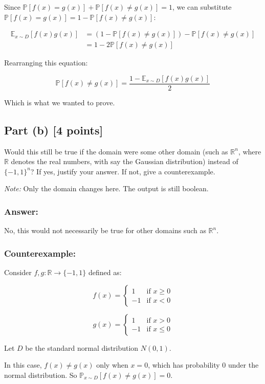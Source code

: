 \documentclass{article}
\begin{document}
Since $\mathbb{P}[f(x) = g(x)] + \mathbb{P}[f(x) \neq g(x)] = 1$, we can substitute $\mathbb{P}[f(x) = g(x)] = 1 - \mathbb{P}[f(x) \neq g(x)]$:

\begin{align*}
\mathbb{E}_{x\sim D}[f(x)g(x)] &= (1 - \mathbb{P}[f(x) \neq g(x)]) - \mathbb{P}[f(x) \neq g(x)] \\
&= 1 - 2\mathbb{P}[f(x) \neq g(x)]
\end{align*}

Rearranging this equation:

\[\mathbb{P}[f(x) \neq g(x)] = \frac{1 - \mathbb{E}_{x\sim D}[f(x)g(x)]}{2}\]

Which is what we wanted to prove.

\subsection*{Part (b) [4 points]}
Would this still be true if the domain were some other domain (such as $\mathbb{R}^n$, where $\mathbb{R}$ denotes the real numbers, with say the Gaussian distribution) instead of $\{-1,1\}^n$? If yes, justify your answer. If not, give a counterexample.

\textit{Note:} Only the domain changes here. The output is still boolean.

\subsubsection*{Answer:}
No, this would not necessarily be true for other domains such as $\mathbb{R}^n$.

\subsubsection*{Counterexample:} 
Consider $f, g: \mathbb{R} \to \{-1,1\}$ defined as:

\[f(x) = \begin{cases} 
1 & \text{if } x \geq 0 \\
-1 & \text{if } x < 0
\end{cases}\]

\[g(x) = \begin{cases}
1 & \text{if } x > 0 \\
-1 & \text{if } x \leq 0
\end{cases}\]

Let $D$ be the standard normal distribution $N(0,1)$.

In this case, $f(x) \neq g(x)$ only when $x = 0$, which has probability 0 under the normal distribution. So $\mathbb{P}_{x\sim D}[f(x) \neq g(x)] = 0$.
\end{document}
